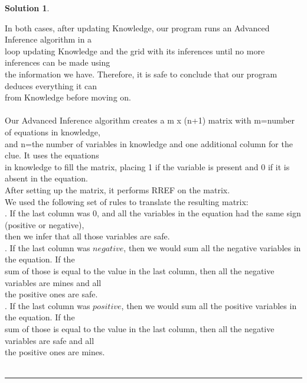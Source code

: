 \documentclass{article}
\theoremstyle{definition}
\def\fline{\rule{0.75\linewidth}{0.5pt}}
\newcommand{\finishline}{\vspace{-15pt}\begin{center}\fline\end{center}}
\newtheorem*{solution*}{Solution}
\newenvironment{solution}{\begin{solution*}}{{\finishline} \end{solution*}}
\begin{document}
\begin{solution}
\begin{tabbing}
    \>In both cases, after updating Knowledge, our program runs an Advanced Inference algorithm in a\\ \>loop updating Knowledge and the grid with its inferences until no more inferences can be made using\\ \> the information we have. Therefore, it is safe to conclude that our program deduces everything it can\\ \> from Knowledge before moving on.\\\\
    
    \>Our Advanced Inference algorithm creates a m x (n+1) matrix with m=number of equations in knowledge,\\ \>and n=the number of variables in knowledge and one additional column for the clue. It uses the equations\\ \>in knowledge to fill the matrix, placing 1 if the variable is present and 0 if it is absent in the equation.\\ \> After setting up the matrix, it performs RREF on the matrix.\\
    \>We used the following set of rules to translate the resulting matrix:\\
    \>. If the last column was $0$, and all the variables in the equation had the same sign (positive or negative),\\ \>\>then we infer that all those variables are safe. \\
    \>. If the last column was $negative$, then we would sum all the negative variables in the equation. If the\\ \>\>sum of those is equal to the value in the last column, then all the negative variables are mines and all\\ \>\>the positive ones are safe.\\
    \>. If the last column was $positive$, then we would sum all the positive variables in the equation. If the\\ \>\>sum of those is equal to the value in the last column, then all the negative variables are safe and all\\ \>\>the positive ones are mines.\\\\
    

\end{tabbing}
\end{solution}
\end{document}
